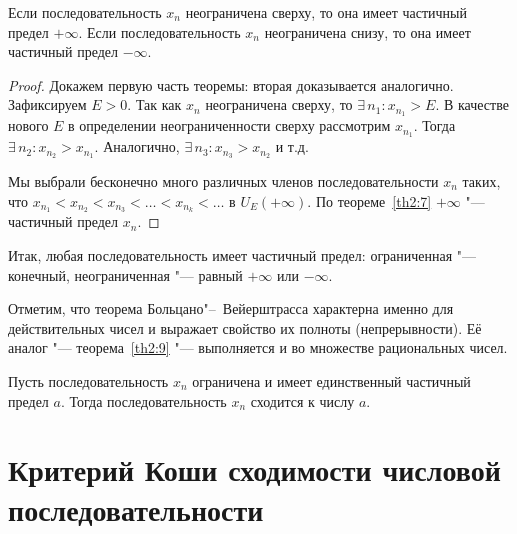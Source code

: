 \begin{thm} \label{th2:9}
Если последовательность $x_n$ неограничена сверху, то она имеет частичный предел $+\infty$. Если последовательность $x_n$ неограничена снизу, то она имеет частичный предел $-\infty$.
\end{thm}

\begin{proof}
Докажем первую часть теоремы: вторая доказывается аналогично. Зафиксируем $E > 0$. Так как $x_n$ неограничена сверху, то $\exists\, n_1 \colon x_{n_1} > E$. В качестве нового $E$ в определении неограниченности сверху рассмотрим $x_{n_1}$. Тогда $\exists\, n_2 \colon x_{n_2} > x_{n_1}$. Аналогично, $\exists\, n_3 \colon x_{n_3} > x_{n_2}$ и т.д.

Мы выбрали бесконечно много различных членов последовательности $x_n$ таких, что $x_{n_1} < x_{n_2} < x_{n_3} < \ldots < x_{n_k} < \ldots$ в $U_E(+\infty)$. По теореме~\ref{th2:7} $+\infty$ "--- частичный предел $x_n$.
\end{proof}

\begin{notion}
Итак, любая последовательность имеет частичный предел: ограниченная "--- конечный, неограниченная "--- равный $+\infty$ или $-\infty$.

Отметим, что теорема Больцано"--~Вейерштрасса характерна именно для действительных чисел и выражает свойство их полноты (непрерывности). Её аналог "--- теорема~\ref{th2:9} "--- выполняется и во множестве рациональных чисел.
\end{notion}


\begin{thm} \label{th2:10}
Пусть последовательность $x_n$ ограничена и имеет единственный частичный предел $a$. Тогда последовательность $x_n$ сходится к числу $a$.
\end{thm}


\section{Критерий Коши сходимости числовой последовательности}


